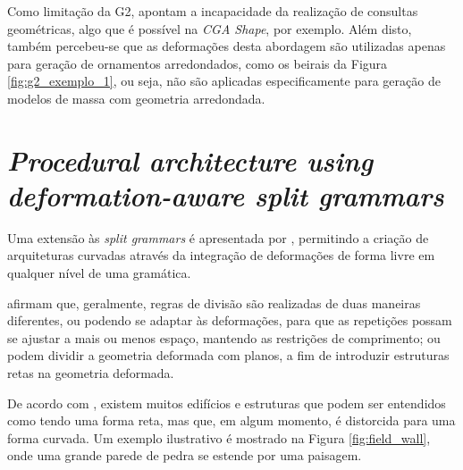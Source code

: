 \begin{figure}[h!]
	\centering
	\captionsetup{width=15cm}
	{}	
\end{figure}

Como limitação da \gls{G2},  apontam a incapacidade da realização de consultas geométricas, algo que é possível na \textit{CGA Shape}, por exemplo. Além disto, também percebeu-se que as deformações desta abordagem são utilizadas apenas para geração de ornamentos arredondados, como os beirais da Figura \ref{fig:g2_exemplo_1}, ou seja, não são aplicadas especificamente para geração de modelos de massa com geometria arredondada.

\newpage
\clearpage

\section{\textit{Procedural architecture using deformation-aware split grammars}} %
\label{sec:paper_zmugg2014_sec1}

Uma extensão às \textit{split grammars} é apresentada por , permitindo a criação de arquiteturas curvadas através da integração de deformações de forma livre em qualquer nível de uma gramática. 

 afirmam que, geralmente, regras de divisão são realizadas de duas maneiras diferentes, ou podendo se adaptar às deformações, para que as repetições possam se ajustar a mais ou menos espaço, mantendo as restrições de comprimento; ou podem dividir a geometria deformada com planos, a fim de introduzir estruturas retas na geometria deformada.

De acordo com , existem muitos edifícios e estruturas que podem ser entendidos como tendo uma forma reta, mas que, em algum momento, é distorcida para uma forma curvada. Um exemplo ilustrativo é mostrado na Figura \ref{fig:field_wall}, onde uma grande parede de pedra se estende por uma paisagem.

